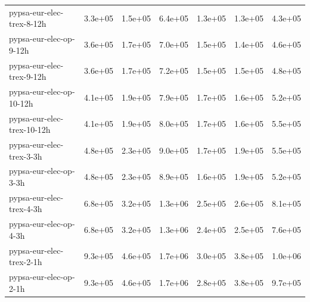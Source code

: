 \documentclass[a4paper]{article}
\newcommand{\0}{\mathbf 0}
\begin{document}
{\begin{longtable}{l|rrr|rrr}
pypsa-eur-elec-trex-8-12h & 3.3e+05 & 1.5e+05 & 6.4e+05 & 1.3e+05 & 1.3e+05 & 4.3e+05 \\
pypsa-eur-elec-op-9-12h & 3.6e+05 & 1.7e+05 & 7.0e+05 & 1.5e+05 & 1.4e+05 & 4.6e+05 \\
pypsa-eur-elec-trex-9-12h & 3.6e+05 & 1.7e+05 & 7.2e+05 & 1.5e+05 & 1.5e+05 & 4.8e+05 \\
pypsa-eur-elec-op-10-12h & 4.1e+05 & 1.9e+05 & 7.9e+05 & 1.7e+05 & 1.6e+05 & 5.2e+05 \\
pypsa-eur-elec-trex-10-12h & 4.1e+05 & 1.9e+05 & 8.0e+05 & 1.7e+05 & 1.6e+05 & 5.5e+05 \\
pypsa-eur-elec-trex-3-3h & 4.8e+05 & 2.3e+05 & 9.0e+05 & 1.7e+05 & 1.9e+05 & 5.5e+05 \\
pypsa-eur-elec-op-3-3h & 4.8e+05 & 2.3e+05 & 8.9e+05 & 1.6e+05 & 1.9e+05 & 5.2e+05 \\
pypsa-eur-elec-trex-4-3h & 6.8e+05 & 3.2e+05 & 1.3e+06 & 2.5e+05 & 2.6e+05 & 8.1e+05 \\
pypsa-eur-elec-op-4-3h & 6.8e+05 & 3.2e+05 & 1.3e+06 & 2.4e+05 & 2.5e+05 & 7.6e+05 \\
pypsa-eur-elec-trex-2-1h & 9.3e+05 & 4.6e+05 & 1.7e+06 & 3.0e+05 & 3.8e+05 & 1.0e+06 \\
pypsa-eur-elec-op-2-1h & 9.3e+05 & 4.6e+05 & 1.7e+06 & 2.8e+05 & 3.8e+05 & 9.7e+05 \\
\hline
\end{longtable}
}
\end{document}
